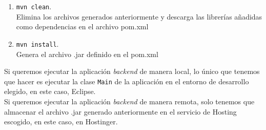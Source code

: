         \begin{enumerate}
          \item\texttt{mvn clean}.\\
          Elimina los archivos generados anteriormente y descarga las librerías añadidas como dependencias en el archivo pom.xml
          \item\texttt{mvn install}. \\
          Genera el archivo .jar definido en el pom.xml
        \end{enumerate}
        
        Si queremos ejecutar la aplicación \textit{backend} de manera local, lo único que tenemos que hacer es ejecutar la clase \texttt{Main} de la aplicación en el entorno de desarrollo elegido, en este caso, Eclipse. \\
        \newline
        Si queremos ejecutar la aplicación \textit{backend} de manera remota, solo tenemos que almacenar el archivo .jar generado anteriormente en el servicio de Hosting escogido, en este caso, en Hostinger\cite{hostinger}.
        
        
        
        
    